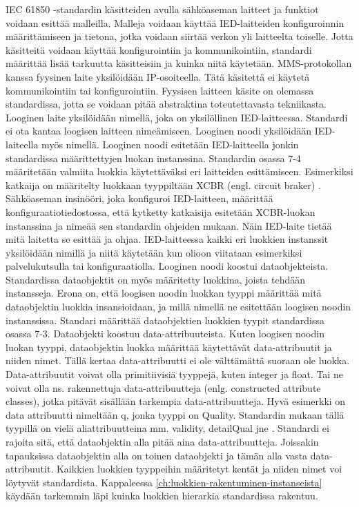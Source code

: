 IEC 61850 -standardin käsitteiden avulla sähköaseman laitteet ja funktiot voidaan esittää malleilla. Malleja voidaan käyttää IED-laitteiden konfiguroinnin määrittämiseen ja tietona, jotka voidaan siirtää verkon yli laitteelta toiselle. Jotta käsitteitä voidaan käyttää konfigurointiin ja kommunikointiin, standardi määrittää lisää tarkuutta käsitteisiin ja kuinka niitä käytetään. MMS-protokollan kanssa fyysinen laite yksilöidään IP-osoiteella. Tätä käsitettä ei käytetä kommunikointiin tai konfigurointiin. Fyysisen laitteen käsite on olemassa standardissa, jotta se voidaan pitää abstraktina toteutettavasta tekniikasta. Looginen laite yksilöidään nimellä, joka on yksilöllinen IED-laitteessa. Standardi ei ota kantaa loogisen laitteen nimeämiseen. Looginen noodi yksilöidään IED-laiteella myös nimellä. Looginen noodi esitetään IED-laitteella jonkin standardissa määrittettyjen luokan instanssina. Standardin osassa 7-4 määritetään valmiita luokkia käytettäväksi eri laitteiden esittämiseen. Esimerkiksi katkaija on määritelty luokkaan tyyppiltään XCBR (engl. circuit braker) \cite[s.~105--106]{IEC61850-7-4}. Sähköaseman insinööri, joka konfiguroi IED-laitteen, määrittää konfiguraatiotiedostossa, että kytketty katkaisija esitetään XCBR-luokan instanssina ja nimeää sen standardin ohjeiden mukaan. Näin IED-laite tietää mitä laitetta se esittää ja ohjaa. IED-laitteessa kaikki eri luokkien instanssit yksilöidään nimillä ja niitä käytetään kun olioon viitataan esimerkiksi palvelukutsulla tai konfiguraatiolla. Looginen noodi koostui dataobjekteista. Standardissa dataobjektit on myös määritetty luokkina, joista tehdään instansseja. Erona on, että loogisen noodin luokkan tyyppi määrittää mitä dataobjektin luokkia insansioidaan, ja millä nimellä ne esitettään loogisen noodin instanssissa. Standari määrittää dataobjektien luokkien tyypit standardissa osassa 7-3. Dataobjekti koostuu data-attribuuteista. Kuten loogisen noodin luokan tyyppi, dataobjektin luokka määrittää käytettävät data-attribuutit ja niiden nimet. Tällä kertaa data-attribuutti ei ole välttämättä suoraan ole luokka. Data-attribuutit voivat olla primitiivisiä tyyppejä, kuten integer ja float. Tai ne voivat olla ns. rakennettuja data-attribuutteja (enlg. constructed attribute classes), jotka pitävät sisällään tarkempia data-attribuutteja. Hyvä esimerkki on data attribuutti nimeltään q, jonka tyyppi on Quality. Standardin mukaan tällä tyypillä on vielä aliattribuutteina mm. validity, detailQual jne \cite[s.~11]{IEC61850-7-3}. Standardi ei rajoita sitä, että dataobjektin alla pitää aina data-attribuutteja. Joissakin tapauksissa dataobjektin alla on toinen dataobjekti ja tämän alla vasta data-attribuutit. Kaikkien luokkien tyyppeihin määritetyt kentät ja niiden nimet voi löytyvät standardista. Kappaleessa \ref{ch:luokkien-rakentuminen-instanseista} käydään tarkemmin läpi kuinka luokkien hierarkia standardissa rakentuu. \cite{IEC61850-1, IEC61850-7-1, IEC61850-7-2, IEC61850-7-3}


